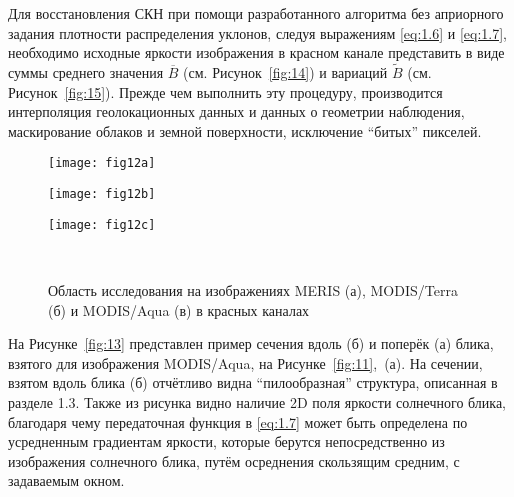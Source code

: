 Для восстановления СКН при помощи разработанного алгоритма без априорного задания плотности распределения уклонов, следуя выражениям \eqref{eq:1.6} и \eqref{eq:1.7}, необходимо исходные яркости изображения в красном канале представить в виде суммы среднего значения $\overline{B}$ (см. Рисунок~\ref{fig:14}) и вариаций $\widetilde{B}$ (см. Рисунок~\ref{fig:15}). Прежде чем выполнить эту процедуру, производится интерполяция геолокационных данных и данных о геометрии наблюдения, маскирование облаков и земной поверхности, исключение ``битых'' пикселей.



\begin{figure}[H]
    	\centering
	\begin{minipage}{.31\textwidth}
	    \subcaptionbox{\label{fig:12a}}
		{\texttt{[image: fig12a]}}
	\end{minipage}
	\hfill
	\begin{minipage}{.31\textwidth}
	    \subcaptionbox{\label{fig:12b}}
		{\texttt{[image: fig12b]}}
	\end{minipage}
	\hfill
	\begin{minipage}{.31\textwidth}
	    \subcaptionbox{\label{fig:12c}}
		{\texttt{[image: fig12c]}}
	\end{minipage}
	\\
    \caption{Область исследования на изображениях MERIS (а), MODIS/Terra (б) и MODIS/Aqua (в) в красных каналах}
    \label{fig:12}
\end{figure}

На Рисунке~\ref{fig:13} представлен пример сечения вдоль (б) и поперёк (а) блика, взятого для изображения MODIS/Aqua, на Рисунке~\ref{fig:11},~(а). На сечении, взятом вдоль блика (б) отчётливо видна ``пилообразная'' структура, описанная в разделе 1.3. Также из рисунка видно наличие 2D поля яркости солнечного блика, благодаря чему передаточная функция в \eqref{eq:1.7} может быть определена по усредненным градиентам яркости, которые берутся непосредственно из изображения солнечного блика, путём осреднения скользящим средним, с задаваемым окном.




